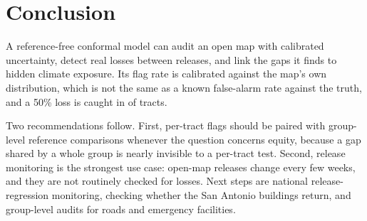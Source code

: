 \documentclass[conference]{IEEEtran}
\begin{document}
\section{Conclusion}
A reference-free conformal model can audit an open map with calibrated uncertainty, detect real losses between releases, and link the gaps it finds to hidden climate exposure. Its flag rate is calibrated against the map's own distribution, which is not the same as a known false-alarm rate against the truth, and a 50\% loss is caught in \DelFiftyBldg{} of tracts.

Two recommendations follow. First, per-tract flags should be paired with group-level reference comparisons whenever the question concerns equity, because a gap shared by a whole group is nearly invisible to a per-tract test. Second, release monitoring is the strongest use case: open-map releases change every few weeks, and they are not routinely checked for losses. Next steps are national release-regression monitoring, checking whether the San Antonio buildings return, and group-level audits for roads and emergency facilities.



\end{document}
